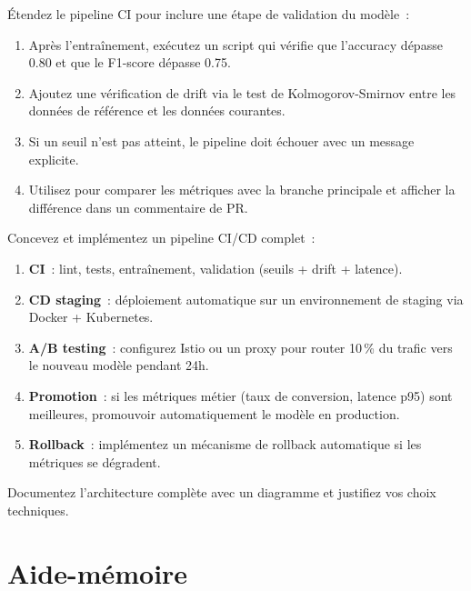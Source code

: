 \begin{exercice}
\'Etendez le pipeline CI pour inclure une \'etape de validation du mod\`ele~:
\begin{enumerate}
    \item Apr\`es l'entra\^inement, ex\'ecutez un script qui v\'erifie que l'accuracy d\'epasse 0.80 et que le F1-score d\'epasse 0.75.
    \item Ajoutez une v\'erification de drift via le test de Kolmogorov-Smirnov entre les donn\'ees de r\'ef\'erence et les donn\'ees courantes.
    \item Si un seuil n'est pas atteint, le pipeline doit \'echouer avec un message explicite.
    \item Utilisez  pour comparer les m\'etriques avec la branche principale et afficher la diff\'erence dans un commentaire de PR.
\end{enumerate}
\end{exercice}

\begin{exercice}
Concevez et impl\'ementez un pipeline CI/CD complet~:
\begin{enumerate}
    \item \textbf{CI}~: lint, tests, entra\^inement, validation (seuils + drift + latence).
    \item \textbf{CD staging}~: d\'eploiement automatique sur un environnement de staging via Docker + Kubernetes.
    \item \textbf{A/B testing}~: configurez Istio ou un proxy pour router 10\,\% du trafic vers le nouveau mod\`ele pendant 24h.
    \item \textbf{Promotion}~: si les m\'etriques m\'etier (taux de conversion, latence p95) sont meilleures, promouvoir automatiquement le mod\`ele en production.
    \item \textbf{Rollback}~: impl\'ementez un m\'ecanisme de rollback automatique si les m\'etriques se d\'egradent.
\end{enumerate}
Documentez l'architecture compl\`ete avec un diagramme et justifiez vos choix techniques.
\end{exercice}

\section{Aide-m\'emoire}
\label{sec:cicd-cheatsheet}

